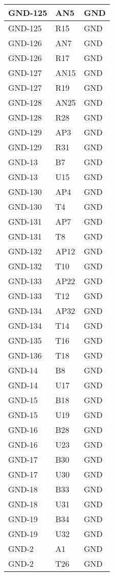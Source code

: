 \begin{footnotesize}
\begin{longtable}{|p{7cm}|p{1cm}|p{5cm}|}
GND-125	&	AN5	&	GND	\\ \hline
GND-125	&	R15	&	GND	\\ \hline
GND-126	&	AN7	&	GND	\\ \hline
GND-126	&	R17	&	GND	\\ \hline
GND-127	&	AN15	&	GND	\\ \hline
GND-127	&	R19	&	GND	\\ \hline
GND-128	&	AN25	&	GND	\\ \hline
GND-128	&	R28	&	GND	\\ \hline
GND-129	&	AP3	&	GND	\\ \hline
GND-129	&	R31	&	GND	\\ \hline
GND-13	&	B7	&	GND	\\ \hline
GND-13	&	U15	&	GND	\\ \hline
GND-130	&	AP4	&	GND	\\ \hline
GND-130	&	T4	&	GND	\\ \hline
GND-131	&	AP7	&	GND	\\ \hline
GND-131	&	T8	&	GND	\\ \hline
GND-132	&	AP12	&	GND	\\ \hline
GND-132	&	T10	&	GND	\\ \hline
GND-133	&	AP22	&	GND	\\ \hline
GND-133	&	T12	&	GND	\\ \hline
GND-134	&	AP32	&	GND	\\ \hline
GND-134	&	T14	&	GND	\\ \hline
GND-135	&	T16	&	GND	\\ \hline
GND-136	&	T18	&	GND	\\ \hline
GND-14	&	B8	&	GND	\\ \hline
GND-14	&	U17	&	GND	\\ \hline
GND-15	&	B18	&	GND	\\ \hline
GND-15	&	U19	&	GND	\\ \hline
GND-16	&	B28	&	GND	\\ \hline
GND-16	&	U23	&	GND	\\ \hline
GND-17	&	B30	&	GND	\\ \hline
GND-17	&	U30	&	GND	\\ \hline
GND-18	&	B33	&	GND	\\ \hline
GND-18	&	U31	&	GND	\\ \hline
GND-19	&	B34	&	GND	\\ \hline
GND-19	&	U32	&	GND	\\ \hline
GND-2	&	A1	&	GND	\\ \hline
GND-2	&	T26	&	GND	\\ \hline

\end{longtable}
\end{footnotesize}
